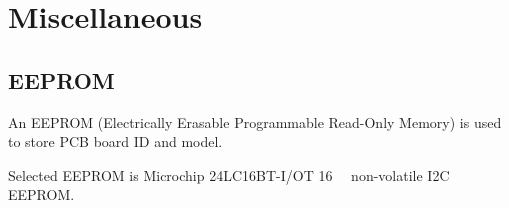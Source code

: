 \section{Miscellaneous}

\subsection{EEPROM}

An EEPROM (Electrically Erasable Programmable Read-Only Memory) is used to store PCB board ID and model.

Selected EEPROM is Microchip 24LC16BT-I/OT \SI{16}{\kilo\bit} non-volatile I2C EEPROM. 